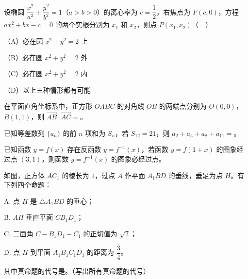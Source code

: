 \begin{question}
设椭圆 $\dfrac{x^2}{a^2}+\dfrac{y^2}{b^2}=1$（$a>b>0$）的离心率为 $e=\dfrac12$，右焦点为 $F(c,0)$，方程 $ax^2+bx-c=0$ 的两个实根分别为 $x_1$ 和 $x_2$，则点 $P(x_1,x_2)$（　）

（A）必在圆 $x^2+y^2=2$ 上

（B）必在圆 $x^2+y^2=2$ 外

（C）必在圆 $x^2+y^2=2$ 内

（D）以上三种情形都有可能

\end{question}

\begin{question}
在平面直角坐标系中，正方形 $OABC$ 的对角线 $OB$ 的两端点分别为 $O(0,0)$，$B(1,1)$，则 $\overrightarrow{AB}\cdot\overrightarrow{AC}=$\gkblank{}。

\end{question}
\begin{question}
已知等差数列 $\{a_n\}$ 的前 $n$ 项和为 $S_n$，若 $S_{12}=21$，则 $a_2+a_5+a_8+a_{11}=$\gkblank{}。

\end{question}
\begin{question}
已知函数 $y=f(x)$ 存在反函数 $y=f^{-1}(x)$，若函数 $y=f(1+x)$ 的图象经过点 $(3,1)$，则函数 $y=f^{-1}(x)$ 的图象必经过点\gkblank{}。

\Needspace{0.4\textheight}
\end{question}
\begin{question}
如图，正方体 $AC_1$ 的棱长为 $1$，过点 $A$ 作平面 $A_1BD$ 的垂线，垂足为点 $H$。有下列四个命题：

A. 点 $H$ 是 $\triangle A_1BD$ 的垂心；

B. $AH$ 垂直平面 $CB_1D_1$；

C. 二面角 $C-B_1D_1-C_1$ 的正切值为 $\sqrt2$；

D. 点 $H$ 到平面 $A_1B_1C_1D_1$ 的距离为 $\dfrac34$。

其中真命题的代号是\gkblank{}。（写出所有真命题的代号）
\nopagebreak[4]
\begin{center}\end{center}
\nopagebreak[4]
\end{question}

